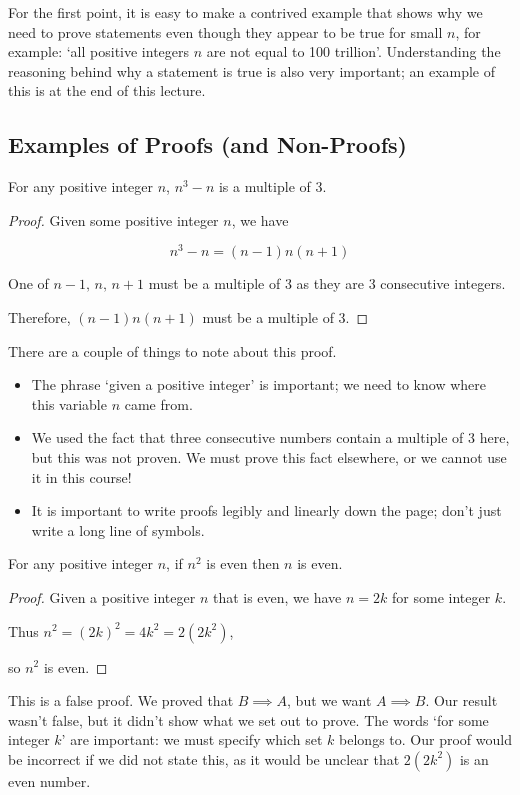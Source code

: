 \documentclass{article}
\begin{document}
For the first point, it is easy to make a contrived example that shows why we need to prove statements even though they appear to be true for small $n$, for example: `all positive integers $n$ are not equal to 100 trillion'. Understanding the reasoning behind why a statement is true is also very important; an example of this is at the end of this lecture.

\subsection{Examples of Proofs (and Non-Proofs)}
\begin{claim}
	For any positive integer $n$, $n^3-n$ is a multiple of 3.
\end{claim}
\begin{proof}
	Given some positive integer $n$, we have

	\[ n^3 - n = (n-1)n(n+1) \]

	One of $n-1,\,n,\,n+1$ must be a multiple of 3 as they are 3 consecutive integers.

	Therefore, $(n-1)n(n+1)$ must be a multiple of 3.
\end{proof}

There are a couple of things to note about this proof.
\begin{itemize}
	\item The phrase `given a positive integer' is important; we need to know where this variable $n$ came from.
	\item We used the fact that three consecutive numbers contain a multiple of 3 here, but this was not proven. We must prove this fact elsewhere, or we cannot use it in this course!
	\item It is important to write proofs legibly and linearly down the page; don't just write a long line of symbols.
\end{itemize}

\begin{claim}
	For any positive integer $n$, if $n^2$ is even then $n$ is even.
\end{claim}
\begin{proof}
	Given a positive integer $n$ that is even, we have $n=2k$ for some integer $k$.

	Thus $n^2 = (2k)^2 = 4k^2 = 2(2k^2)$,

	so $n^2$ is even.
\end{proof}
\begin{note}
	This is a false proof. We proved that $B \implies A$, but we want $A \implies B$. Our result wasn't false, but it didn't show what we set out to prove. The words `for some integer $k$' are important: we must specify which set $k$ belongs to. Our proof would be incorrect if we did not state this, as it would be unclear that $2(2k^2)$ is an even number.
\end{note}
\end{document}
